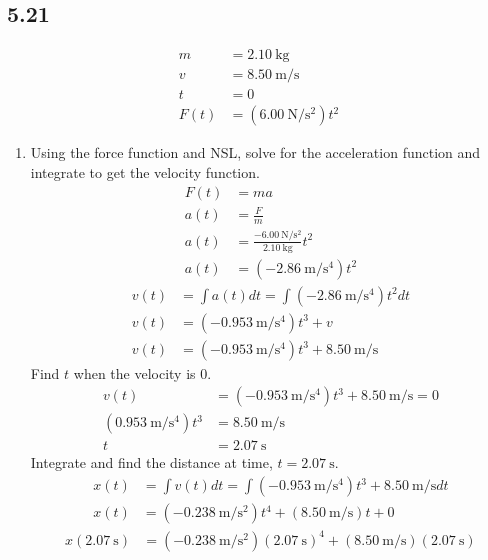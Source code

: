 \documentclass{article}
\begin{document}
\subsection{5.21}
\begin{align*}
	m & = \SI{2.10}{\kilogram} \\
	v & = \SI{8.50}{\meter \per \second} \\
	t & = 0 \\
	F(t) & = (\SI{6.00}{\newton \per \second \squared})t^2
\end{align*}
\begin{enumerate}[label=\textbf{(\alph*)}]
	\item
		Using the force function and NSL, solve for the acceleration function and integrate to get the velocity function.
		\begin{align*}
			F(t) & = ma \\
			a(t) & = \frac{F}{m} \\
			a(t) & = \frac{-\SI{6.00}{\newton \per \second \squared}}{\SI{2.10}{\kilogram}}t^2 \\
			a(t) & = (-\SI{2.86}{\meter \per \second \tothe 4})t^2
		\end{align*}
		\begin{align*}
			v(t) & = \int a(t) dt = \int (-\SI{2.86}{\meter \per \second \tothe 4})t^2 dt \\
			v(t) & = (-\SI{0.953}{\meter \per \second \tothe 4})t^3 + v \\
			v(t) & = (-\SI{0.953}{\meter \per \second \tothe 4})t^3 + \SI{8.50}{\meter \per \second}
		\end{align*}
		Find $ t $ when the velocity is $ 0 $.
		\begin{align*}
			v(t) & = (-\SI{0.953}{\meter \per \second \tothe 4})t^3 + \SI{8.50}{\meter \per \second} = 0 \\
			(\SI{0.953}{\meter \per \second \tothe 4})t^3 & = \SI{8.50}{\meter \per \second} \\
			t & = \SI{2.07}{\second}
		\end{align*}
		Integrate and find the distance at time, $ t = \SI{2.07}{\second} $.
		\begin{align*}
			x(t) & = \int v(t) dt = \int (-\SI{0.953}{\meter \per \second \tothe 4})t^3 + \SI{8.50}{\meter \per \second} dt \\
			x(t) & = (-\SI{0.238}{\meter \per \second \squared})t^4 + (\SI{8.50}{\meter \per \second})t + 0
		\end{align*}
		\begin{align*}
			x(\SI{2.07}{\second}) & = (-\SI{0.238}{\meter \per \second \squared})(\SI{2.07}{\second})^4 + (\SI{8.50}{\meter \per \second})(\SI{2.07}{\second}) \\

\end{align*}
\end{enumerate}
\end{document}
